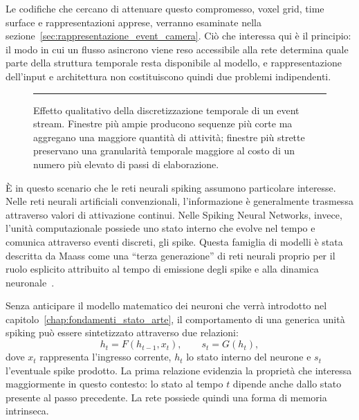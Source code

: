 Le codifiche che cercano di attenuare questo compromesso, voxel grid, time surface e rappresentazioni apprese, verranno esaminate nella sezione~\ref{sec:rappresentazione_event_camera}. Ciò che interessa qui è il principio: il modo in cui un flusso asincrono viene reso accessibile alla rete determina quale parte della struttura temporale resta disponibile al modello, e rappresentazione dell'input e architettura non costituiscono quindi due problemi indipendenti.

\begin{figure}[htbp]
    \centering
    \rule{0.9\textwidth}{4.5cm} %
    \caption{Effetto qualitativo della discretizzazione temporale di un event stream. Finestre più ampie producono sequenze più corte ma aggregano una maggiore quantità di attività; finestre più strette preservano una granularità temporale maggiore al costo di un numero più elevato di passi di elaborazione.}
    \label{fig:event_discretization}
\end{figure}

È in questo scenario che le reti neurali spiking assumono particolare interesse. Nelle reti neurali artificiali convenzionali, l'informazione è generalmente trasmessa attraverso valori di attivazione continui. Nelle Spiking Neural Networks, invece, l'unità computazionale possiede uno stato interno che evolve nel tempo e comunica attraverso eventi discreti, gli spike. Questa famiglia di modelli è stata descritta da Maass come una ``terza generazione'' di reti neurali proprio per il ruolo esplicito attribuito al tempo di emissione degli spike e alla dinamica neuronale~\cite{maass1997networks}.

Senza anticipare il modello matematico dei neuroni che verrà introdotto nel capitolo~\ref{chap:fondamenti_stato_arte}, il comportamento di una generica unità spiking può essere sintetizzato attraverso due relazioni:
\begin{equation}
\label{eq:snn_generica}
h_t = F(h_{t-1}, x_t), \qquad s_t = G(h_t),
\end{equation}
dove $x_t$ rappresenta l'ingresso corrente, $h_t$ lo stato interno del neurone e $s_t$ l'eventuale spike prodotto. La prima relazione evidenzia la proprietà che interessa maggiormente in questo contesto: lo stato al tempo $t$ dipende anche dallo stato presente al passo precedente. La rete possiede quindi una forma di memoria intrinseca.

